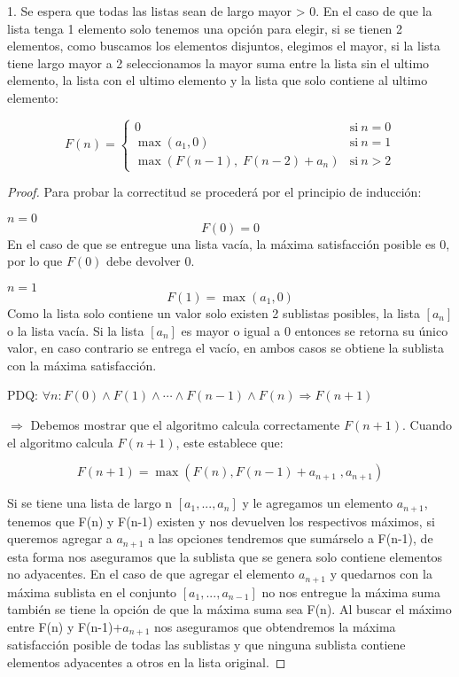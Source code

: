 \documentclass[
	spanish, %
	letterpaper, oneside
]{article}
\begin{document}
1. Se espera que todas las listas sean de largo mayor > 0. En el caso de que la lista tenga 1 elemento solo tenemos una opción para elegir, si se tienen 2 elementos, como buscamos los elementos disjuntos, elegimos el mayor, si la lista tiene largo mayor a 2 seleccionamos la mayor suma entre la lista sin el ultimo elemento, la lista con el ultimo elemento y la lista que solo contiene al ultimo elemento:

\begin{equation}
    \label{}
    F(n) = \left\{
          \begin{array}{ll}
            0 & \mathrm{si\ } n = 0 \\
            \max(a_1,0) & \mathrm{si\ } n = 1 \\
            \max(F(n-1),\; F(n-2)+a_n) & \mathrm{si\ } n > 2
          \end{array}
        \right.
\end{equation}

\begin{proof}
	Para probar la correctitud se procederá por el principio de inducción:


    $n=0$
    $$F(0) = 0$$
    En el caso de que se entregue una lista vacía, la máxima satisfacción posible es 0, por lo que $F(0)$ debe devolver 0.

	$n=1$
    $$F(1) = \max(a_1, 0)$$
    Como la lista solo contiene un valor solo existen 2 sublistas posibles, la lista $[a_n]$ o la lista vacía. Si la lista $[a_n]$ es mayor o igual a 0 entonces se retorna su único valor, en caso contrario se entrega el vacío, en ambos casos se obtiene la sublista con la máxima satisfacción.


    PDQ: $\forall n:  F(0) \land F(1) \land \cdots \land F(n-1) \land F(n) \Rightarrow F(n+1)$
    
    $\Rightarrow$ Debemos mostrar que el algoritmo calcula correctamente $F(n+1)$. Cuando el algoritmo calcula $F(n+1)$, este establece que:

    $$F(n+1) = \max(F(n), F(n-1) + a_{n+1}\;,a_{n+1})$$

    Si se tiene una lista de largo n $[a_1,...,a_n]$ y le agregamos un elemento $a_{n+1}$, tenemos que F(n) y F(n-1) existen y nos devuelven los respectivos máximos, si queremos agregar a $a_{n+1}$ a las opciones tendremos que sumárselo a F(n-1), de esta forma nos aseguramos que la sublista que se genera solo contiene elementos no adyacentes. En el caso de que agregar el elemento $a_{n+1}$ y quedarnos con la máxima sublista en el conjunto $[a_1,...,a_{n-1}]$ no nos entregue la máxima suma también se tiene la opción de que la máxima suma sea F(n). Al buscar el máximo entre F(n) y F(n-1)+$a_{n+1}$ nos aseguramos que obtendremos la máxima satisfacción posible de todas las sublistas y que ninguna sublista contiene elementos adyacentes a otros en la lista original.
    

\end{proof}
\newpage
\end{document}
